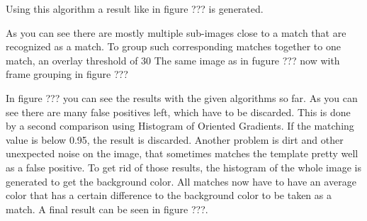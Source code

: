 Using this algorithm a result like in figure ??? is generated.

As you can see there are mostly multiple sub-images close to a match that are recognized as a match.
To group such corresponding matches together to one match, an overlay threshold of 30%
The same image as in fugure ??? now with frame grouping in figure ???

In figure ??? you can see the results with the given algorithms so far.
As you can see there are many false positives left, which have to be discarded.
This is done by a second comparison using Histogram of Oriented Gradients.
If the matching value is below 0.95, the result is discarded.
Another problem is dirt and other unexpected noise on the image, that sometimes matches the template pretty well as a false positive.
To get rid of those results, the histogram of the whole image is generated to get the background color.
All matches now have to have an average color that has a certain difference to the background color to be taken as a match.
A final result can be seen in figure ???.

